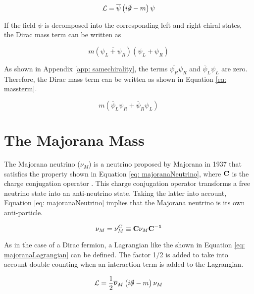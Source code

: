 \begin{equation}\label{eq: diracLagrangian}
 \mathcal{L} = \overline{\psi}\left(i\slashed{\partial} - m\right)\psi
\end{equation} 

If the field $\psi$ is decomposed into the corresponding left and right chiral states, the Dirac mass term can be written as 

$$m(\overline{\psi_{L} + \psi_{R}})(\psi_{L} + \psi_{R})$$

As shown in Appendix \ref{app: samechirality}, the terms $\bar{\psi_{R}}\psi_{R}$ and $\overline{\psi}_{L}\psi_{L}$ are zero. Therefore, the Dirac mass term can be written as shown in Equation \ref{eq: massterm}. 

\begin{equation} \label{eq: massterm}
m \left(\overline{\psi}_{L}\psi_{R} + \overline{\psi}_{R}\psi_{L}\right)
\end{equation}


\section{The Majorana Mass}

The Majorana neutrino ($\nu_{M}$) is a neutrino proposed by Majorana in 1937 that satisfies the property shown in Equation \ref{eq: majoranaNeutrino}, where $\mathbf{C}$ is the charge conjugation operator \cite{NeutrinoMass}. This charge conjugation operator transforms a free neutrino state into an anti-neutrino state. Taking the latter into account, Equation \ref{eq: majoranaNeutrino} implies that the Majorana neutrino is its own anti-particle. 

\begin{equation}\label{eq: majoranaNeutrino}
\nu_{M} = \nu^{C}_{M} \equiv \mathbf{C}\nu_{M}\mathbf{C^{-1}}
\end{equation}

As in the case of a Dirac fermion, a Lagrangian like the shown in Equation \ref{eq: majoranaLagrangian} can be defined. The factor 1/2 is added to take into account double counting when an interaction term is added to the Lagrangian.   

\begin{equation}\label{eq: majoranaLagrangian}
\mathcal{L} = \frac{1}{2}\overline{\nu}_{M}\left(i\slashed{\partial} - m\right)\nu_{M}
\end{equation}

